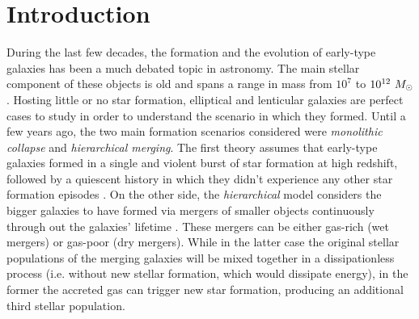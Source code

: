 

\fontsize{12}{12}\selectfont
\section{Introduction} \label{sec:introduction}
%
	During the last few decades, the formation and the evolution of early-type galaxies has been a much debated topic 
	in astronomy. 
	The main stellar component of these objects is old and spans a range in mass from $10^7$ to 
	$10^{12}~M_{\rm{\odot}}$. 
	Hosting little or no star formation, elliptical and lenticular galaxies are perfect cases to study in order to 
	understand the scenario in which they formed. 
	Until a few years ago, the two main formation scenarios considered were \textit{monolithic collapse} and 
	\textit{hierarchical merging}. 
	The first theory assumes that early-type galaxies formed in a single and violent burst of star formation at high 
	redshift, followed by a quiescent history in which they didn't experience any other star formation episodes 
	\citep{Larson74, Carlberg84, Arimoto87}. 
	On the other side, the \textit{hierarchical} model considers the bigger galaxies to have formed via mergers of 
	smaller objects continuously through out the galaxies' lifetime \citep{Toomre72}. 
	These mergers can be either gas-rich (wet mergers) or gas-poor (dry mergers). 
	While in the latter case the original stellar populations of the merging galaxies will be mixed together in a dissipationless 
	process (i.e. without new stellar formation, which would dissipate energy), in the former the accreted gas can 
	trigger new star formation, producing an additional third stellar population.

